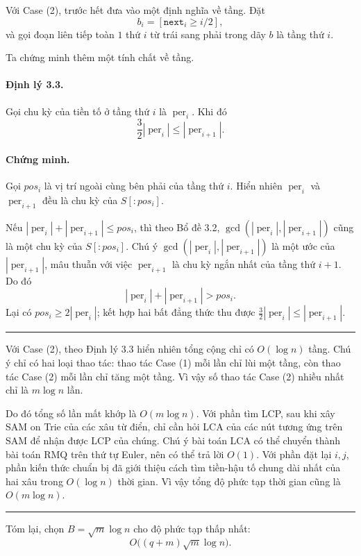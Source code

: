 \documentclass[11pt]{article}
\newcommand{\qedmark}{\hfill\rule{0.7ex}{0.7ex}}
\begin{document}
Với Case (2), trước hết đưa vào một định nghĩa về tầng. Đặt
\[
  b_i=[\texttt{next}_i\ge i/2],
\]
và gọi đoạn liên tiếp toàn \(1\) thứ \(i\) từ trái sang phải trong dãy \(b\) là
tầng thứ \(i\).

Ta chứng minh thêm một tính chất về tầng.

\paragraph{Định lý 3.3.}
Gọi chu kỳ của tiền tố ở tầng thứ \(i\) là \(\operatorname{per}_i\). Khi đó
\[
  \frac{3}{2}|\operatorname{per}_i|\le |\operatorname{per}_{i+1}|.
\]

\paragraph{Chứng minh.}
Gọi \(pos_i\) là vị trí ngoài cùng bên phải của tầng thứ \(i\). Hiển nhiên
\(\operatorname{per}_i\) và \(\operatorname{per}_{i+1}\) đều là chu kỳ của
\(S[:pos_i]\).

Nếu \(|\operatorname{per}_i|+|\operatorname{per}_{i+1}|\le pos_i\), thì theo
Bổ đề 3.2, \(\gcd(|\operatorname{per}_i|,|\operatorname{per}_{i+1}|)\) cũng là
một chu kỳ của \(S[:pos_i]\). Chú ý
\(\gcd(|\operatorname{per}_i|,|\operatorname{per}_{i+1}|)\) là một ước của
\(|\operatorname{per}_{i+1}|\), mâu thuẫn với việc \(\operatorname{per}_{i+1}\)
là chu kỳ ngắn nhất của tầng thứ \(i+1\). Do đó
\[
  |\operatorname{per}_i|+|\operatorname{per}_{i+1}|>pos_i.
\]
Lại có \(pos_i\ge 2|\operatorname{per}_i|\); kết hợp hai bất đẳng thức thu được
\(\frac{3}{2}|\operatorname{per}_i|\le |\operatorname{per}_{i+1}|\). \qedmark

Với Case (2), theo Định lý 3.3 hiển nhiên tổng cộng chỉ có \(O(\log n)\) tầng.
Chú ý chỉ có hai loại thao tác: thao tác Case (1) mỗi lần chỉ lùi một tầng, còn
thao tác Case (2) mỗi lần chỉ tăng một tầng. Vì vậy số thao tác Case (2) nhiều
nhất chỉ là \(m\log n\) lần.

Do đó tổng số lần mất khớp là \(O(m\log n)\). Với phần tìm LCP, sau khi xây SAM
on Trie của các xâu từ điển, chỉ cần hỏi LCA của các nút tương ứng trên SAM để
nhận được LCP của chúng. Chú ý bài toán LCA có thể chuyển thành bài toán RMQ
trên thứ tự Euler, nên có thể trả lời \(O(1)\). Với phần đặt lại \(i,j\), phần
kiến thức chuẩn bị đã giới thiệu cách tìm tiền-hậu tố chung dài nhất của hai
xâu trong \(O(\log n)\) thời gian. Vì vậy tổng độ phức tạp thời gian cũng là
\(O(m\log n)\). \qedmark

Tóm lại, chọn \(B=\sqrt{m}\log n\) cho độ phức tạp thấp nhất:
\[
  O\bigl((q+m)\sqrt{m}\log n\bigr).
\]
\end{document}
